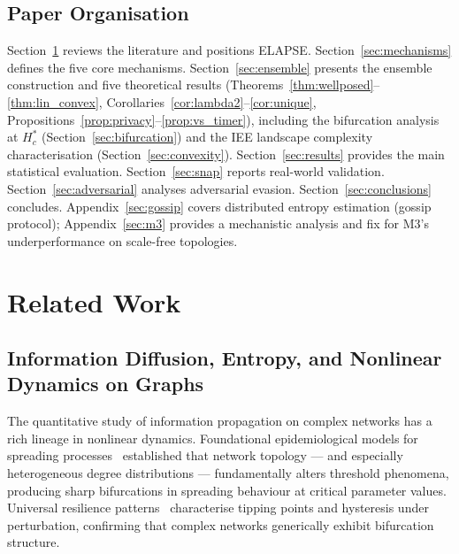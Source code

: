 \documentclass[review,12pt]{elsarticle}
\newcommand{\Hc}{H_c}
\begin{document}
\subsection{Paper Organisation}

Section~\ref{sec:related} reviews the literature and positions ELAPSE.
Section~\ref{sec:mechanisms} defines the five core mechanisms.
Section~\ref{sec:ensemble} presents the ensemble construction and five
theoretical results (Theorems~\ref{thm:wellposed}--\ref{thm:lin_convex},
Corollaries~\ref{cor:lambda2}--\ref{cor:unique},
Propositions~\ref{prop:privacy}--\ref{prop:vs_timer}), including the
bifurcation analysis at $\Hc^*$ (Section~\ref{sec:bifurcation}) and the
IEE landscape complexity characterisation (Section~\ref{sec:convexity}).
Section~\ref{sec:results} provides the main statistical evaluation.
Section~\ref{sec:snap} reports real-world validation.
Section~\ref{sec:adversarial} analyses adversarial evasion.
Section~\ref{sec:conclusions} concludes.
Appendix~\ref{sec:gossip} covers distributed entropy estimation
(gossip protocol); Appendix~\ref{sec:m3} provides a mechanistic
analysis and fix for M3's underperformance on scale-free topologies.

\section{Related Work}
\label{sec:related}

\subsection{Information Diffusion, Entropy, and Nonlinear Dynamics on Graphs}

The quantitative study of information propagation on complex networks has a
rich lineage in nonlinear dynamics. Foundational epidemiological models for
spreading processes~\cite{pastor2015epidemic} established that network topology ---
and especially heterogeneous degree distributions --- fundamentally alters
threshold phenomena, producing sharp bifurcations in spreading behaviour at
critical parameter values. Universal resilience patterns~\cite{gao2016universal}
characterise tipping points and hysteresis under perturbation, confirming that
complex networks generically exhibit bifurcation structure.
\end{document}
